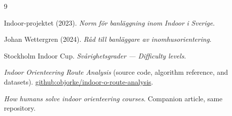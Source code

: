 \documentclass[11pt,a4paper,twocolumn]{article}
\begin{document}
\begin{thebibliography}{9}

Indoor-projektet (2023). \emph{Norm f\"or banl\"aggning inom Indoor i
Sverige}.

Johan Wettergren (2024). \emph{R\r{a}d till banl\"aggare av
inomhusorientering}.

Stockholm Indoor Cup. \emph{Sv\r{a}righetsgrader --- Difficulty levels}.

\emph{Indoor Orienteering Route Analysis} (source code, algorithm reference,
and datasets). \newblock
\url{github:objorke/indoor-o-route-analysis}.

\emph{How humans solve indoor orienteering courses}. Companion article, same
repository.

\end{thebibliography}
\end{document}
